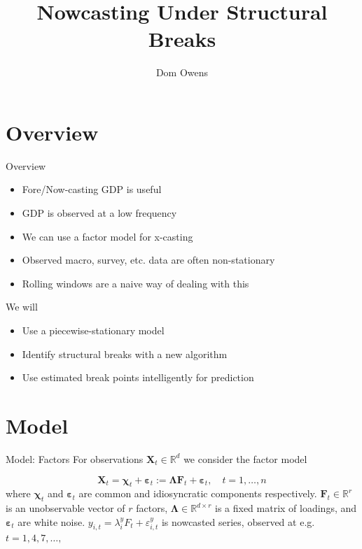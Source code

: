\documentclass[11pt]{beamer}
\author{Dom Owens}
\title{Nowcasting Under Structural Breaks}
\begin{document}
\begin{frame}
\titlepage
\end{frame}

\begin{frame}
\tableofcontents
\end{frame}

\section{Overview}
\begin{frame}{Overview}
 
\begin{itemize}
	\item Fore/Now-casting GDP is useful
	\item GDP is observed at a low frequency
	\item We can use a factor model for x-casting
	\item Observed macro, survey, etc. data are often non-stationary
	\item Rolling windows are a naive way of dealing with this 
\end{itemize}

We will
\begin{itemize}
	\item Use a piecewise-stationary model
	\item Identify structural breaks with a new algorithm
	\item Use estimated break points intelligently for prediction
\end{itemize}
 
\end{frame}

\section{Model}
\begin{frame}{Model: Factors}
 For observations $\boldsymbol{X}_t \in \mathbb{R}^d$ we consider the factor model

\begin{equation} \label{factor model}
	\boldsymbol{X}_t = \boldsymbol{\chi}_t + \boldsymbol{\varepsilon}_t :=
	\boldsymbol{\Lambda} \boldsymbol{F}_t + \boldsymbol{\varepsilon}_t, \quad t = 1, \dots, n
\end{equation}
where $\boldsymbol{\chi}_t$ and $\boldsymbol{\varepsilon}_t$ are common and idiosyncratic components respectively.
 $\boldsymbol{F}_t \in \mathbb{R}^{r}$ is an unobservable vector of $r$ factors, $\boldsymbol{\Lambda} \in \mathbb{R}^{d \times r}$ is a fixed matrix of loadings, and $\boldsymbol{\varepsilon}_t$ are white noise.
${y}_{i,t} = \lambda^y_{i}{F}_{t} + {\varepsilon}^y_{i,t}$ is nowcasted series, observed at e.g. $t=1,4,7, \dots,$
\end{frame} 
 
\end{document}
